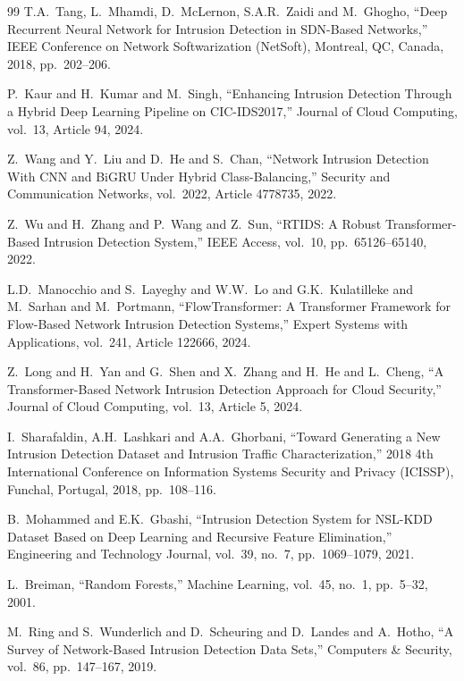 \documentclass[5p,times]{elsarticle}
\begin{document}
\begin{thebibliography}{99}
		T.A.\ Tang, L.\ Mhamdi, D.\ McLernon, S.A.R.\ Zaidi and M.\ Ghogho,
		``Deep Recurrent Neural Network for Intrusion Detection in SDN-Based Networks,''
		IEEE Conference on Network Softwarization (NetSoft),
		Montreal, QC, Canada,
		2018,
		pp.\ 202--206.
		
		P.\ Kaur and H.\ Kumar and M.\ Singh,
		``Enhancing Intrusion Detection Through a Hybrid Deep Learning Pipeline on CIC-IDS2017,''
		Journal of Cloud Computing,
		vol.\ 13,
		Article 94,
		2024.
		
		Z.\ Wang and Y.\ Liu and D.\ He and S.\ Chan,
		``Network Intrusion Detection With CNN and BiGRU Under Hybrid Class-Balancing,''
		Security and Communication Networks,
		vol.\ 2022,
		Article 4778735,
		2022.
		
		Z.\ Wu and H.\ Zhang and P.\ Wang and Z.\ Sun,
		``RTIDS: A Robust Transformer-Based Intrusion Detection System,''
		IEEE Access,
		vol.\ 10,
		pp.\ 65126--65140,
		2022.
		
		L.D.\ Manocchio and S.\ Layeghy and W.W.\ Lo and G.K.\ Kulatilleke and M.\ Sarhan and M.\ Portmann,
		``FlowTransformer: A Transformer Framework for Flow-Based Network Intrusion Detection Systems,''
		Expert Systems with Applications,
		vol.\ 241,
		Article 122666,
		2024.
		
		Z.\ Long and H.\ Yan and G.\ Shen and X.\ Zhang and H.\ He and L.\ Cheng,
		``A Transformer-Based Network Intrusion Detection Approach for Cloud Security,''
		Journal of Cloud Computing,
		vol.\ 13,
		Article 5,
		2024.
		
		I.\ Sharafaldin, A.H.\ Lashkari and A.A.\ Ghorbani,
		``Toward Generating a New Intrusion Detection Dataset and Intrusion Traffic Characterization,''
		2018 4th International Conference on Information Systems Security and Privacy (ICISSP),
		Funchal, Portugal,
		2018,
		pp.\ 108--116.
		
		B.\ Mohammed and E.K.\ Gbashi,
		``Intrusion Detection System for NSL-KDD Dataset Based on Deep Learning and Recursive Feature Elimination,''
		Engineering and Technology Journal,
		vol.\ 39,
		no.\ 7,
		pp.\ 1069--1079,
		2021.
		
		L.\ Breiman,
		``Random Forests,''
		Machine Learning,
		vol.\ 45,
		no.\ 1,
		pp.\ 5--32,
		2001.
		
		M.\ Ring and S.\ Wunderlich and D.\ Scheuring and D.\ Landes and A.\ Hotho,
		``A Survey of Network-Based Intrusion Detection Data Sets,''
		Computers \& Security,
		vol.\ 86,
		pp.\ 147--167,
		2019.
		

\end{thebibliography}
\end{document}
